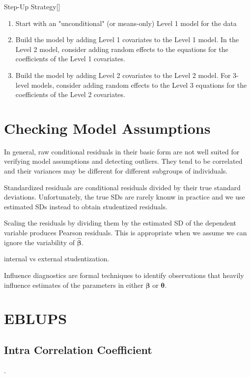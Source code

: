 \documentclass[english]{article}
\begin{document}
\begin{multicols*}{2}
\begin{definitionGENERAL}{Step-Up Strategy}[]
\begin{enumerate}
	\item	Start with an "unconditional" (or means-only) Level 1 model for the data
	\item	Build the model by adding Level 1 covariates to the Level 1 model. In the Level 2 model, consider adding random effects to the equations for the coefficients of the Level 1 covariates.
	\item	Build the model by adding Level 2 covariates to the Level 2 model. For 3-level models, consider adding random effects to the Level 3 equations for the coefficients of the Level 2 covariates.	
\end{enumerate}
\end{definitionGENERAL}

\section{Checking Model Assumptions}
In general, raw conditional residuals in their basic form are not well suited for verifying model assumptions and detecting outliers. They tend to be correlated and their variances may be different for different subgroups of individuals.

\bigskip

Standardized residuals are conditional residuals divided by their true standard deviations. Unfortunately, the true SDs are rarely knonw in practice and we use estimated SDs instead to obtain studentized residuals.

\bigskip

Scaling the residuals by dividing them by the estimated SD of the dependent variable produces Pearson residuals. This is appropriate when we assume we can ignore the variability of $\hat{\bm{\beta}}$. 

\bigskip

internal vs external studentization.

\bigskip

Influence diagnostics are formal techniques to identify observations that heavily influence estimates of the parameters in either $\bm{\beta}$ or $\bm{\theta}$.

\section{EBLUPS}

\subsection{Intra Correlation Coefficient}
.


\end{multicols*}
\end{document}
